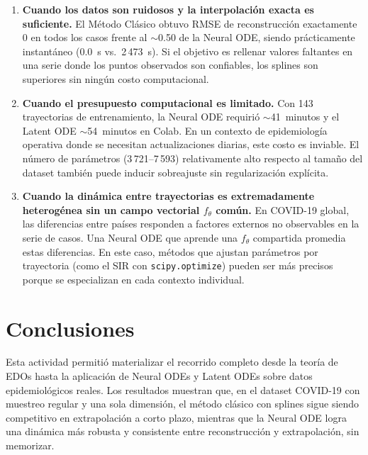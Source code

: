 \documentclass[12pt,a4paper]{article}
\begin{document}
\begin{enumerate}
  \item \textbf{Cuando los datos son ruidosos y la interpolación exacta es
    suficiente.}
    El Método Clásico obtuvo RMSE de reconstrucción exactamente 0 en todos los
    casos frente al $\sim$0.50 de la Neural ODE, siendo prácticamente instantáneo
    (0.0~s vs.\ 2\,473~s).
    Si el objetivo es rellenar valores faltantes en una serie donde los puntos
    observados son confiables, los splines son superiores sin ningún costo
    computacional.

  \item \textbf{Cuando el presupuesto computacional es limitado.}
    Con 143 trayectorias de entrenamiento, la Neural ODE requirió
    $\sim$41~minutos y el Latent ODE $\sim$54~minutos en Colab.
    En un contexto de epidemiología operativa donde se necesitan actualizaciones
    diarias, este costo es inviable.
    El número de parámetros (3\,721--7\,593) relativamente alto respecto al
    tamaño del dataset también puede inducir sobreajuste sin regularización
    explícita.

  \item \textbf{Cuando la dinámica entre trayectorias es extremadamente
    heterogénea sin un campo vectorial $f_\theta$ común.}
    En COVID-19 global, las diferencias entre países responden a factores
    externos no observables en la serie de casos.
    Una Neural ODE que aprende una $f_\theta$ compartida promedia estas
    diferencias.
    En este caso, métodos que ajustan parámetros por trayectoria (como el SIR
    con \texttt{scipy.optimize}) pueden ser más precisos porque se especializan
    en cada contexto individual.
\end{enumerate}

\section{Conclusiones}
\label{sec:conclusiones}

Esta actividad permitió materializar el recorrido completo desde la teoría de
EDOs hasta la aplicación de Neural ODEs y Latent ODEs sobre datos
epidemiológicos reales.
Los resultados muestran que, en el dataset COVID-19 con muestreo regular y una
sola dimensión, el método clásico con splines sigue siendo competitivo en
extrapolación a corto plazo, mientras que la Neural ODE logra una dinámica más
robusta y consistente entre reconstrucción y extrapolación, sin memorizar.
\end{document}
